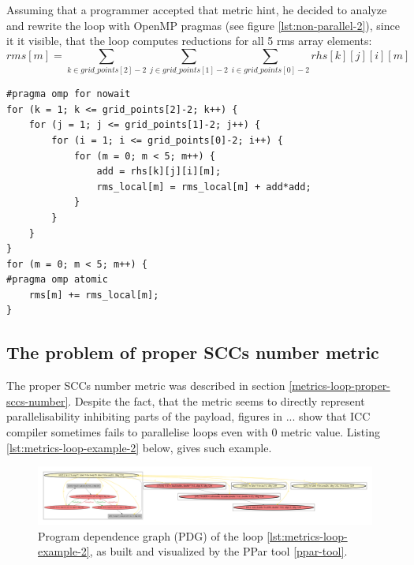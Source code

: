 \null\qquad Assuming that a programmer accepted that metric hint, he decided to analyze and rewrite the loop with OpenMP pragmas (see figure \ref{lst:non-parallel-2}), since it it visible, that the loop computes reductions for all 5 rms array elements:\newline
\begin{equation}
rms\left[ m \right] = \sum\limits_{k \in grid\_points\left[ 2\right] -2}\sum\limits_{j \in grid\_points\left[ 1\right] -2}\sum\limits_{i \in grid\_points\left[ 0\right] -2} rhs\left[ k\right] \left[ j\right] \left[ i\right] \left[ m\right]
\end{equation}
\begin{lstlisting}[caption={Loop, which has not been parallelized by Intel C/C++ compiler, but does seem algorithmically parallelizible, given absense of cross-iteration dependencies introduced by the function call. }, captionpos=b, label=lst:non-parallel-2, float,floatplacement=H]
#pragma omp for nowait
for (k = 1; k <= grid_points[2]-2; k++) {
	for (j = 1; j <= grid_points[1]-2; j++) {
		for (i = 1; i <= grid_points[0]-2; i++) {
			for (m = 0; m < 5; m++) {
				add = rhs[k][j][i][m];
				rms_local[m] = rms_local[m] + add*add;
			} 
		} 
	} 
} 
for (m = 0; m < 5; m++) {
#pragma omp atomic
	rms[m] += rms_local[m];
}
\end{lstlisting}




\subsection{The problem of proper SCCs number metric}
\qquad The proper SCCs number metric was described in section \ref{metrics-loop-proper-sccs-number}. Despite the fact, that the metric seems to directly represent parallelisability inhibiting parts of the payload, figures in ... show that ICC compiler sometimes fails to parallelise loops even with 0 metric value. Listing \ref{lst:metrics-loop-example-2} below, gives such example.



\begin{figure}[htb]
	\centering
	\includegraphics[width=\linewidth]{figs/metrics-example-loop-2-pdg.pdf}
	\caption{Program dependence graph (PDG) of the loop \ref{lst:metrics-loop-example-2}, as built and visualized by the PPar tool \ref{ppar-tool}.}
	\label{metrics-example-loop-2-pdg}
\end{figure}


